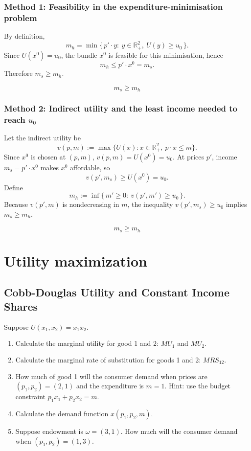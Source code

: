 \documentclass[12pt]{article}
\newcommand{\Rp}{\mathbb{R}_+}
\newcommand{\dotp}{\cdot}
\begin{document}
\subsubsection*{Method 1: Feasibility in the expenditure-minimisation problem}
By definition,
\[
m_h=\min\{\,p'\dotp y:\ y\in\Rp^2,\ U(y)\ge u_0\,\}.
\]
Since \(U(x^0)=u_0\), the bundle \(x^0\) is feasible for this minimisation, hence
\[
m_h \le p'\dotp x^0 = m_s.
\]
Therefore \(m_s\ge m_h\).

\[
\boxed{\,m_s \ge m_h\,}
\]

\subsubsection*{Method 2: Indirect utility and the least income needed to reach \(u_0\)}
Let the indirect utility be
\[
v(p,m):=\max\{U(x): x\in\Rp^2,\ p\dotp x\le m\}.
\]
Since \(x^0\) is chosen at \((p,m)\), \(v(p,m)=U(x^0)=u_0\).
At prices \(p'\), income \(m_s=p'\dotp x^0\) makes \(x^0\) affordable, so
\[
v(p',m_s)\ge U(x^0)=u_0.
\]
Define
\[
m_h:=\inf\{\,m'\ge 0:\ v(p',m')\ge u_0\,\}.
\]
Because \(v(p',m)\) is nondecreasing in \(m\), the inequality \(v(p',m_s)\ge u_0\) implies \(m_s\ge m_h\).

\[
\boxed{\,m_s \ge m_h\,}
\]

\newpage
\section{Utility maximization}

\subsection{Cobb-Douglas Utility and Constant Income Shares}
Suppose \(U(x_1,x_2)=x_1x_2\).
\begin{enumerate}[label=\arabic*., leftmargin=*]
  \item Calculate the marginal utility for good 1 and 2: \(MU_1\) and \(MU_2\).
  \item Calculate the marginal rate of substitution for goods 1 and 2: \(MRS_{12}\).
  \item How much of good 1 will the consumer demand when prices are \((p_1,p_2)=(2,1)\) and the expenditure is \(m=1\). Hint: use the budget constraint \(p_1x_1+p_2x_2=m\).
  \item Calculate the demand function \(x(p_1,p_2,m)\).
  \item Suppose endowment is \(\omega=(3,1)\). How much will the consumer demand when \((p_1,p_2)=(1,3)\).
\end{enumerate}
\end{document}
